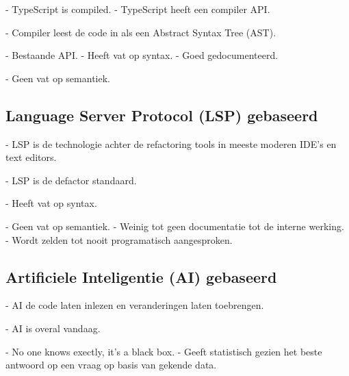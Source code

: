 
- TypeScript is compiled.
- TypeScript heeft een compiler API.


- Compiler leest de code in als een Abstract Syntax Tree (AST).


- Bestaande API.
- Heeft vat op syntax.
- Goed gedocumenteerd.


- Geen vat op semantiek.

\subsection{Language Server Protocol (LSP) gebaseerd}
\label{ch:stand-van-zaken:refactoring:lsp}


- LSP is de technologie achter de refactoring tools in meeste moderen IDE's en text editors.


- LSP is de defactor standaard.


- Heeft vat op syntax.


- Geen vat op semantiek.
- Weinig tot geen documentatie tot de interne werking.
- Wordt zelden tot nooit programatisch aangesproken.

\subsection{Artificiele Inteligentie (AI) gebaseerd}
\label{ch:stand-van-zaken:refactoring:ai}


- AI de code laten inlezen en veranderingen laten toebrengen.


- AI is overal vandaag.


- No one knows exectly, it's a black box.
- Geeft statistisch gezien het beste antwoord op een vraag op basis van gekende data.


